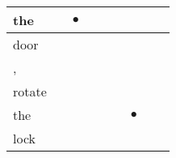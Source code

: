 \documentclass[landscape]{article}
\newcommand{\ssp}{\hspace{2pt}}
\newcommand{\mex}{\cellcolor{g}$\bullet$}
\begin{document}
\begin{tabular}{|l|p{10pt}|p{10pt}|p{10pt}|p{10pt}|p{10pt}|p{10pt}|p{10pt}|p{10pt}|}
\hline
\ssp \cellcolor{ref1}the \ssp&\hspace{2pt}&\hspace{2pt}\mex&\hspace{2pt}&\hspace{2pt}&\hspace{2pt}&\hspace{2pt}&\hspace{2pt}&\hspace{2pt}\\
\hline
\ssp door \ssp&\hspace{2pt}&\hspace{2pt}&\hspace{2pt}&\hspace{2pt}&\hspace{2pt}&\hspace{2pt}&\hspace{2pt}&\hspace{2pt}\\
\hline
\ssp , \ssp&\hspace{2pt}&\hspace{2pt}&\hspace{2pt}&\hspace{2pt}&\hspace{2pt}&\hspace{2pt}&\hspace{2pt}&\hspace{2pt}\\
\hline
\ssp rotate \ssp&\hspace{2pt}&\hspace{2pt}&\hspace{2pt}&\hspace{2pt}&\hspace{2pt}&\hspace{2pt}&\hspace{2pt}&\hspace{2pt}\\
\hline
\ssp \cellcolor{ref5}the \ssp&\hspace{2pt}&\hspace{2pt}&\hspace{2pt}&\hspace{2pt}&\hspace{2pt}&\hspace{2pt}\mex&\hspace{2pt}&\hspace{2pt}\\
\hline
\ssp lock \ssp&\hspace{2pt}&\hspace{2pt}&\hspace{2pt}&\hspace{2pt}&\hspace{2pt}&\hspace{2pt}&\hspace{2pt}&\hspace{2pt}\\

\end{tabular}
\end{document}
